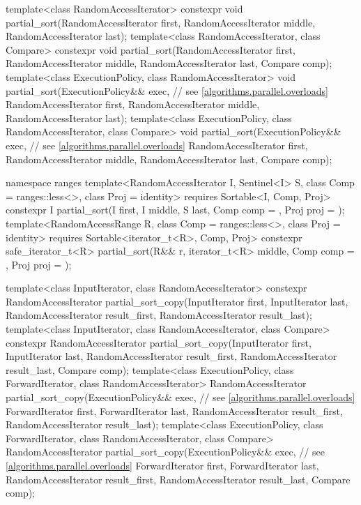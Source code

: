 \begin{codeblock}
{  template<class RandomAccessIterator>
    constexpr void partial_sort(RandomAccessIterator first,
                                RandomAccessIterator middle,
                                RandomAccessIterator last);
  template<class RandomAccessIterator, class Compare>
    constexpr void partial_sort(RandomAccessIterator first,
                                RandomAccessIterator middle,
                                RandomAccessIterator last, Compare comp);
  template<class ExecutionPolicy, class RandomAccessIterator>
    void partial_sort(ExecutionPolicy&& exec, // see \ref{algorithms.parallel.overloads}
                      RandomAccessIterator first,
                      RandomAccessIterator middle,
                      RandomAccessIterator last);
  template<class ExecutionPolicy, class RandomAccessIterator, class Compare>
    void partial_sort(ExecutionPolicy&& exec, // see \ref{algorithms.parallel.overloads}
                      RandomAccessIterator first,
                      RandomAccessIterator middle,
                      RandomAccessIterator last, Compare comp);

  namespace ranges {
    template<RandomAccessIterator I, Sentinel<I> S, class Comp = ranges::less<>,
             class Proj = identity>
      requires Sortable<I, Comp, Proj>
      constexpr I
        partial_sort(I first, I middle, S last, Comp comp = {}, Proj proj = {});
    template<RandomAccessRange R, class Comp = ranges::less<>, class Proj = identity>
      requires Sortable<iterator_t<R>, Comp, Proj>
      constexpr safe_iterator_t<R>
        partial_sort(R&& r, iterator_t<R> middle, Comp comp = {},
                     Proj proj = {});
  }

  template<class InputIterator, class RandomAccessIterator>
    constexpr RandomAccessIterator
      partial_sort_copy(InputIterator first, InputIterator last,
                        RandomAccessIterator result_first,
                        RandomAccessIterator result_last);
  template<class InputIterator, class RandomAccessIterator, class Compare>
    constexpr RandomAccessIterator
      partial_sort_copy(InputIterator first, InputIterator last,
                        RandomAccessIterator result_first,
                        RandomAccessIterator result_last,
                        Compare comp);
  template<class ExecutionPolicy, class ForwardIterator, class RandomAccessIterator>
    RandomAccessIterator
      partial_sort_copy(ExecutionPolicy&& exec,  // see \ref{algorithms.parallel.overloads}
                        ForwardIterator first, ForwardIterator last,
                        RandomAccessIterator result_first,
                        RandomAccessIterator result_last);
  template<class ExecutionPolicy, class ForwardIterator, class RandomAccessIterator,
           class Compare>
    RandomAccessIterator
      partial_sort_copy(ExecutionPolicy&& exec,  // see \ref{algorithms.parallel.overloads}
                        ForwardIterator first, ForwardIterator last,
                        RandomAccessIterator result_first,
                        RandomAccessIterator result_last,
                        Compare comp);

}
\end{codeblock}
